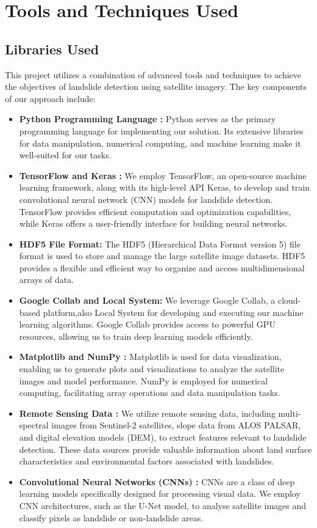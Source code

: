 \documentclass[12pt,a4paper]{report}
\begin{document}
	\section{Tools and Techniques Used}
	\label{Libraries Used}
		\subsection{Libraries Used}
		This project utilizes a combination of advanced tools and techniques to achieve the objectives of landslide detection using satellite imagery. The key components of our approach include:
		
\begin{itemize}
    \item  \textbf{Python Programming Language :} Python serves as the primary programming language for implementing our solution. Its extensive libraries for data manipulation, numerical computing, and machine learning make it well-suited for our tasks. 
    
    \item \textbf{TensorFlow and Keras :} We employ TensorFlow, an open-source machine learning framework, along with its high-level API Keras, to develop and train convolutional neural network (CNN) models for landslide detection. TensorFlow provides efficient computation and optimization capabilities, while Keras offers a user-friendly interface for building neural networks.
    \item \textbf{HDF5 File Format:} The HDF5 (Hierarchical Data Format version 5) file format is used to store and manage the large satellite image datasets. HDF5 provides a flexible and efficient way to organize and access multidimensional arrays of data.
    \item \textbf{Google Collab and Local System:} We leverage Google Collab, a cloud-based platform,also Local System for developing and executing our machine learning algorithms. Google Collab provides access to powerful GPU resources, allowing us to train deep learning models efficiently.
    \item \textbf{Matplotlib and NumPy :} Matplotlib is used for data visualization, enabling us to generate plots and visualizations to analyze the satellite images and model performance. NumPy is employed for numerical computing, facilitating array operations and data manipulation tasks.
    \item \textbf{Remote Sensing Data :} We utilize remote sensing data, including multi-spectral images from Sentinel-2 satellites, slope data from ALOS PALSAR, and digital elevation models (DEM), to extract features relevant to landslide detection. These data sources provide valuable information about land surface characteristics and environmental factors associated with landslides. \cite{ra_rsencing}
    \item \textbf{Convolutional Neural Networks (CNNs) :} CNNs are a class of deep learning models specifically designed for processing visual data. We employ CNN architectures, such as the U-Net model, to analyse satellite images and classify pixels as landslide or non-landslide areas. \cite{homl}
\end{itemize}
		\vspace{0.5cm}
\end{document}
